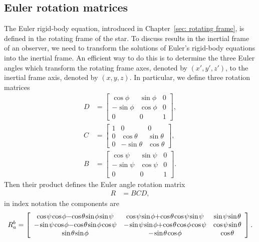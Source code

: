 \documentclass[../full_thesis/full_thesis.tex]{subfiles}
\begin{document}
\subsection{Euler rotation matrices}
\label{sec: euler rotation matrices}
The Euler rigid-body equation, introduced in Chapter~\ref{sec: rotating frame},
is defined in the rotating frame of the star. To discuss results in the
inertial frame of an observer, we need to transform the solutions of Euler's
rigid-body equations into the inertial frame.  An efficient way to do this is
to determine the three Euler angles which transform the rotating frame axes,
denoted by $(x',y', z')$, to the inertial frame axis, denoted by $(x, y, z)$.
In particular, we define three rotation matrices
\begin{align}
D & = \left[\begin{array}{ccc}
\cos\phi & \sin\phi & 0 \\
-\sin\phi & \cos\phi & 0 \\
0 & 0 & 1
\end{array}
\right],
\\
C & =
\left[\begin{array}{ccc}
1 & 0 & 0 \\
0 & \cos\theta & \sin\theta \\
0 & -\sin\theta & \cos\theta
\end{array}
\right], \\
B & = \left[\begin{array}{ccc}
\cos\psi & \sin\psi & 0 \\
-\sin\psi & \cos\psi & 0 \\
0 & 0 & 1
\end{array}
\right].
\end{align}
Then their product defines the Euler angle rotation matrix
\begin{align}
R & = BCD,
\end{align}
in index notation the components are
\begin{align}
\medmuskip=0mu
\thinmuskip=1.5mu
\thickmuskip=0mu
R^{b}_{\;a} = \left[
\begin{array}{ccc}
\cos\psi \cos\phi - \cos\theta \sin\phi \sin \psi &
\cos\psi \sin \phi + \cos\theta \cos \psi \sin \psi &
\sin \psi \sin\theta \\
-\sin\psi \cos\phi - \cos\theta\sin\phi\cos\psi &
-\sin\psi\sin\phi + \cos\theta\cos\phi\cos\psi &
\cos\psi \sin\theta \\
\sin\theta\sin\phi &
-\sin\theta \cos\phi &
\cos\theta
\end{array}
\right].
\label{eqn: rotation matrix}
\end{align}
\end{document}
